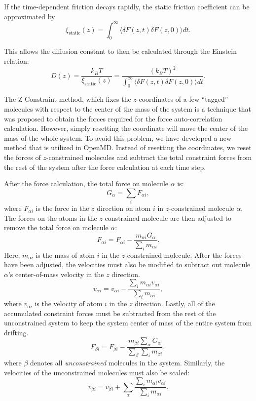 \documentclass[]{book}
\begin{document}
If the time-dependent friction decays rapidly, the static friction
coefficient can be approximated by
\begin{equation}
\xi_{\text{static}}(z)=\int_{0}^{\infty}\langle\delta F(z,t)\delta F(z,0)\rangle dt.
\end{equation}

This allows the diffusion constant to then be calculated through the
Einstein relation:\cite{Marrink94}
\begin{equation}
D(z)=\frac{k_{B}T}{\xi_{\text{static}}(z)}=\frac{(k_{B}T)^{2}}{\int_{0}^{\infty
}\langle\delta F(z,t)\delta F(z,0)\rangle dt}.%
\end{equation}

The Z-Constraint method, which fixes the $z$ coordinates of a few
``tagged'' molecules with respect to the center of the mass of the
system is a technique that was proposed to obtain the forces required
for the force auto-correlation calculation.\cite{Marrink94} However,
simply resetting the coordinate will move the center of the mass of
the whole system. To avoid this problem, we have developed a new
method that is utilized in {\sc OpenMD}. Instead of resetting the
coordinates, we reset the forces of $z$-constrained molecules and
subtract the total constraint forces from the rest of the system after
the force calculation at each time step.

After the force calculation, the total force on molecule $\alpha$ is:
\begin{equation}
G_{\alpha} = \sum_i F_{\alpha i},
\label{eq:zc1}
\end{equation}
where $F_{\alpha i}$ is the force in the $z$ direction on atom $i$ in
$z$-constrained molecule $\alpha$. The forces on the atoms in the
$z$-constrained molecule are then adjusted to remove the total force
on molecule $\alpha$:
\begin{equation}
F_{\alpha i} = F_{\alpha i} - 
	\frac{m_{\alpha i} G_{\alpha}}{\sum_i m_{\alpha i}}.
\end{equation}
Here, $m_{\alpha i}$ is the mass of atom $i$ in the $z$-constrained
molecule.  After the forces have been adjusted, the velocities must
also be modified to subtract out molecule $\alpha$'s center-of-mass
velocity in the $z$ direction.
\begin{equation}
v_{\alpha i} = v_{\alpha i} -
	\frac{\sum_i m_{\alpha i} v_{\alpha i}}{\sum_i m_{\alpha i}},
\end{equation}
where $v_{\alpha i}$ is the velocity of atom $i$ in the $z$ direction.
Lastly, all of the accumulated constraint forces must be subtracted
from the rest of the unconstrained system to keep the system center of
mass of the entire system from drifting.
\begin{equation}
F_{\beta i} = F_{\beta i} - \frac{m_{\beta i} \sum_{\alpha} G_{\alpha}}
	{\sum_{\beta}\sum_i m_{\beta i}},
\end{equation}
where $\beta$ denotes all {\it unconstrained} molecules in the
system. Similarly, the velocities of the unconstrained molecules must
also be scaled:
\begin{equation}
v_{\beta i} = v_{\beta i} + \sum_{\alpha} \frac{\sum_i m_{\alpha i}
v_{\alpha i}}{\sum_i m_{\alpha i}}.
\end{equation}
\end{document}
